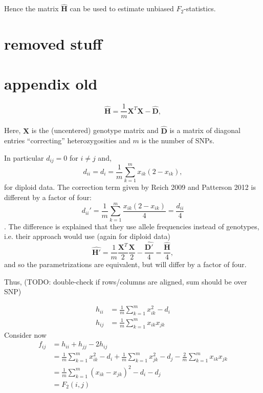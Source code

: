 \documentclass[12pt, letterpaper]{article}
\newcommand{\MX}{\mathbf{X}}
\begin{document}
Hence the matrix $\hat{\mathbf{H}}$ can be used to estimate unbiased $F_2$-statistics.



\section{removed stuff}

\section{appendix old}
\begin{equation}
    \hat{\mathbf{H}} = \frac{1}{m}\mathbf{X}^T\mathbf{X} - \hat{\mathbf{D}},
\end{equation}

Here, $\MX$ is the (uncentered) genotype matrix and $\hat{\mathbf{D}}$ is a matrix of diagonal entries ``correcting'' heterozygosities and $m$ is the number of SNPs.

In particular $d_{ij} = 0 $ for $i \neq j$ and, 
\begin{equation}
    d_{ii} = d_i = \frac{1}{m}\sum_{k=1}^m x_{ik}(2-x_{ik}),
\end{equation}
for diploid data. The correction term given by Reich 2009 and Patterson 2012 is different by a factor of four:
\begin{equation*}
    d_{ii}' = \frac{1}{m}\sum_{k=1}^m \frac{x_{ik}(2-x_{ik})}{4} = \frac{d_{ii}}{4}
\end{equation*}.
The difference is explained that they use allele frequencies instead of genotypes, i.e. their approach would use (again for diploid data)
\begin{equation*}
    \hat{\mathbf{H}'} = \frac{1}{m}\frac{\mathbf{X}^T}{2}\frac{\mathbf{X}}{2} - \frac{\hat{\mathbf{D'}}}{4} = \frac{\hat{\mathbf{H}}}{4},
\end{equation*}
and so the parametrizations are equivalent, but will differ by a factor of four.

Thus, (TODO: double-check if rows/columns are aligned, sum should be over SNP)

\begin{subequations}\begin{align}
    h_{ii} &= \frac{1}{m}\sum_{k=1}^m x_{ik}^2 - d_i \\
    h_{ij} &= \frac{1}{m}\sum_{k=1}^m x_{ik}x_{jk} 
\end{align}\end{subequations}
Consider now
\begin{align}
    f_{ij} &= h_{ii} + h_{jj} - 2 h_{ij}\nonumber\\
     &= \frac{1}{m}\sum_{k=1}^m x_{ik}^2 - d_i + \frac{1}{m}\sum_{k=1}^m x_{jk}^2 - d_j - \frac{2}{m}\sum_{k=1}^m x_{ik}x_{jk}\nonumber \\
    &= \frac{1}{m} \sum_{k=1}^m (x_{ik} - x_{jk})^2 - d_i - d_j \\
    &= F_2(i,j)\nonumber
\end{align}
\end{document}
